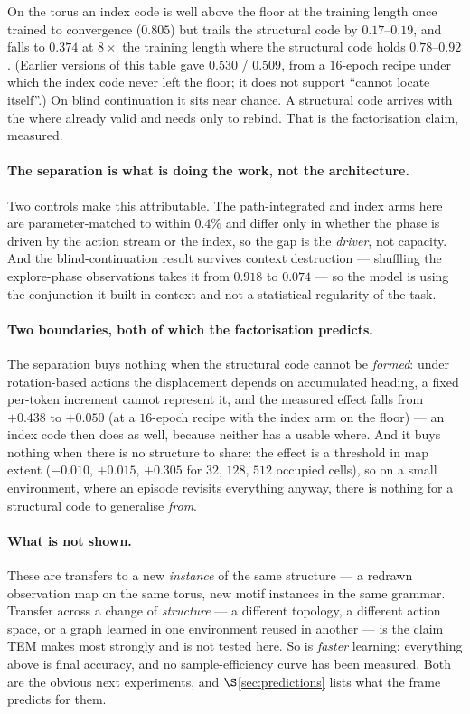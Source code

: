 \documentclass[11pt]{article}
\begin{document}
\noindent On the torus an index code is well above the floor at the training length
once trained to convergence ($0.805$) but trails the structural code by $0.17$--$0.19$,
and falls to $0.374$ at $8\times$ the training length where the structural code holds
$0.78$--$0.92$. (Earlier versions of this table gave $0.530$ / $0.509$, from a
$16$-epoch recipe under which the index code never left the floor; it does not
support ``cannot locate itself''.) On blind continuation it sits near chance. A
structural code arrives with the where already valid and needs only to rebind. That
is the factorisation claim, measured.

\paragraph{The separation is what is doing the work, not the architecture.} Two
controls make this attributable. The path-integrated and index arms here are
parameter-matched to within $0.4\%$ and differ only in whether the phase is driven
by the action stream or the index, so the gap is the \emph{driver}, not capacity.
And the blind-continuation result survives context destruction --- shuffling the
explore-phase observations takes it from $0.918$ to $0.074$ --- so the model is
using the conjunction it built in context and not a statistical regularity of the
task.

\paragraph{Two boundaries, both of which the factorisation predicts.} The separation
buys nothing when the structural code cannot be \emph{formed}: under rotation-based
actions the displacement depends on accumulated heading, a fixed per-token increment
cannot represent it, and the measured effect falls from $+0.438$ to $+0.050$ (at a
$16$-epoch recipe with the index arm on the floor) --- an index code then does as well,
because neither has a usable where. And it buys
nothing when there is no structure to share: the effect is a threshold in map extent
($-0.010$, $+0.015$, $+0.305$ for $32$, $128$, $512$ occupied cells), so on a small
environment, where an episode revisits everything anyway, there is nothing for a
structural code to generalise \emph{from}.

\paragraph{What is not shown.} These are transfers to a new \emph{instance} of the
same structure --- a redrawn observation map on the same torus, new motif instances
in the same grammar. Transfer across a change of \emph{structure} --- a different
topology, a different action space, or a graph learned in one environment reused in
another --- is the claim TEM makes most strongly and is not tested here. So is
\emph{faster} learning: everything above is final accuracy, and no sample-efficiency
curve has been measured. Both are the obvious next experiments, and
$\S$\ref{sec:predictions} lists what the frame predicts for them.
\end{document}
